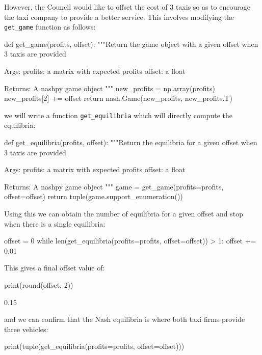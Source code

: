 However, the Council would like to offset the cost of 3
taxis so as to encourage the taxi company to provide a better service. This
involves modifying the \texttt{get_game} function as follows:

\begin{pyin}
def get_game(profits, offset):
    """Return the game object with a given offset
    when 3 taxis are provided

    Args:
        profits: a matrix with expected profits
        offset: a float

    Returns:
        A nashpy game object
    """
    new_profits = np.array(profits)
    new_profits[2] += offset
    return nash.Game(new_profits, new_profits.T)
\end{pyin}

we will write a function \texttt{get_equilibria} which will directly
compute the equilibria:

\begin{pyin}
def get_equilibria(profits, offset):
    """Return the equilibria for a given offset
    when 3 taxis are provided

    Args:
        profits: a matrix with expected profits
        offset: a float

    Returns:
        A nashpy game object
    """
    game = get_game(profits=profits, offset=offset)
    return tuple(game.support_enumeration())
\end{pyin}


Using this we can obtain the number of equilibria for a given offset and stop
when there is a single equilibria:

\begin{pyin}
offset = 0
while len(get_equilibria(profits=profits, offset=offset)) > 1:
    offset += 0.01
\end{pyin}

This gives a final offset value of:

\begin{pyin}
print(round(offset, 2))
\end{pyin}


\begin{pyout}
0.15
\end{pyout}

and we can confirm that the Nash equilibria is where both taxi firms provide
three vehicles:

\begin{pyin}
print(tuple(get_equilibria(profits=profits, offset=offset)))
\end{pyin}


